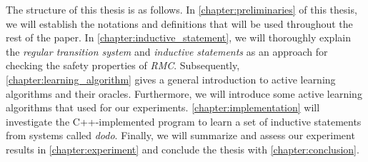 The structure of this thesis is as follows.
In \autoref{chapter:preliminaries} of this thesis, we will establish the notations and definitions that will be used throughout the rest of the paper.
In \autoref{chapter:inductive_statement}, we will thoroughly explain the
\textit{regular transition system} and \textit{inductive statements} as an approach 
for checking the safety properties of \textit{RMC}. 
Subsequently, \autoref{chapter:learning_algorithm} gives a general introduction
to active learning algorithms and their oracles.
Furthermore, we will introduce some active learning algorithms that used 
for our experiments.
\autoref{chapter:implementation} will investigate the C++-implemented program to
learn a set of inductive statements from systems called \textit{dodo}. 
Finally, we will summarize and assess our experiment results in \autoref{chapter:experiment} 
and conclude the thesis with \autoref{chapter:conclusion}.